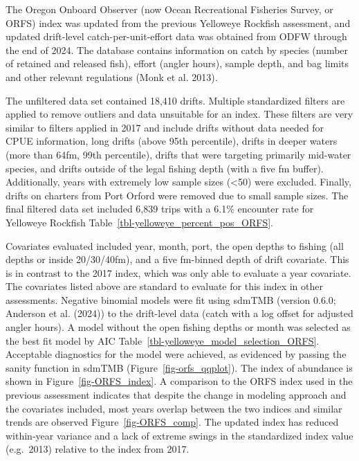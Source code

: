 \documentclass[
]{scrartcl}
\begin{document}
The Oregon Onboard Observer (now Ocean Recreational Fisheries Survey, or
ORFS) index was updated from the previous Yelloweye Rockfish assessment,
and updated drift-level catch-per-unit-effort data was obtained from
ODFW through the end of 2024. The database contains information on catch
by species (number of retained and released fish), effort (angler
hours), sample depth, and bag limits and other relevant regulations
(Monk et al. 2013).

The unfiltered data set contained 18,410 drifts. Multiple standardized
filters are applied to remove outliers and data unsuitable for an index.
These filters are very similar to filters applied in 2017 and include
drifts without data needed for CPUE information, long drifts (above 95th
percentile), drifts in deeper waters (more than 64fm, 99th percentile),
drifts that were targeting primarily mid-water species, and drifts
outside of the legal fishing depth (with a five fm buffer).
Additionally, years with extremely low sample sizes (\textless50) were
excluded. Finally, drifts on charters from Port Orford were removed due
to small sample sizes. The final filtered data set included 6,839 trips
with a 6.1\% encounter rate for Yelloweye Rockfish
Table~\ref{tbl-yelloweye_percent_pos_ORFS}.

Covariates evaluated included year, month, port, the open depths to
fishing (all depths or inside 20/30/40fm), and a five fm-binned depth of
drift covariate. This is in contrast to the 2017 index, which was only
able to evaluate a year covariate. The covariates listed above are
standard to evaluate for this index in other assessments. Negative
binomial models were fit using sdmTMB (version 0.6.0; Anderson et al.
(2024)) to the drift-level data (catch with a log offset for adjusted
angler hours). A model without the open fishing depths or month was
selected as the best fit model by AIC
Table~\ref{tbl-yelloweye_model_selection_ORFS}. Acceptable diagnostics
for the model were achieved, as evidenced by passing the sanity function
in sdmTMB (Figure~\ref{fig-orfs_qqplot}). The index of abundance is
shown in Figure~\ref{fig-ORFS_index}. A comparison to the ORFS index
used in the previous assessment indicates that despite the change in
modeling approach and the covariates included, most years overlap
between the two indices and similar trends are observed
Figure~\ref{fig-ORFS_comp}. The updated index has reduced within-year
variance and a lack of extreme swings in the standardized index value
(e.g.~2013) relative to the index from 2017.
\end{document}
